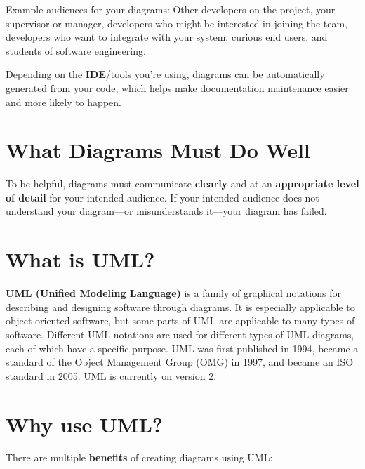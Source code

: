 Example audiences for your diagrams: Other developers on the project, your supervisor or manager, developers who might be interested in joining the team, developers who want to integrate with your system, curious end users, and students of software engineering.

Depending on the \textbf{IDE}\marginpar{\ideDef}/tools you're using, diagrams can be automatically generated from your code, which helps make documentation maintenance easier and  more likely to happen.

\section{What Diagrams Must Do Well}
To be helpful, diagrams must communicate \textbf{clearly} and at an \textbf{appropriate level of detail} for your intended audience. If your intended audience does not understand your diagram---or misunderstands it---your diagram has failed.

\section{What is UML?}

\textbf{UML (Unified Modeling Language)}\marginpar{\umlDef} is a family of graphical notations for describing and designing software through diagrams. It is especially applicable to object-oriented software, but some parts of UML are applicable to many types of software. Different UML notations are used for different types of UML diagrams, each of which have a specific purpose. UML was first published in 1994, became a standard of the Object Management Group (OMG) in 1997, and became an ISO standard in 2005. UML is currently on version 2.

\section{Why use UML?}

There are multiple \textbf{benefits} of creating diagrams using UML:\\

